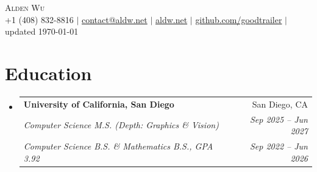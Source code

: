 \documentclass[letterpaper,11pt]{article}
\makeatletter
\newcommand{\resumeSubheadingMS}[6]{
  \vspace{-2pt}\item
    \begin{tabular*}{0.97\textwidth}[t]{l@{\extracolsep{\fill}}r}
      \textbf{#1} & #2 \\
      \textit{\small#3} & \textit{\small #4} \\
      \textit{\small#5} & \textit{\small #6} \\
    \end{tabular*}\vspace{-7pt}
}
\newcommand{\resumeSubHeadingListStart}{\begin{itemize}[leftmargin=0.15in, label={}]}
\newcommand{\resumeSubHeadingListEnd}{\end{itemize}}
\makeatother
\begin{document}

\begin{center}
    {\huge \scshape Alden Wu} \\[0.2em]
    \small
    +1 (408) 832-8816 $\mid$
    \href{mailto:contact@aldw.net}{contact@aldw.net} $\mid$
    \href{https://aldw.net/projects}{aldw.net} $\mid$
    \href{https://github.com/goodtrailer}{github.com/goodtrailer} $\mid$
    updated \today
\end{center}

\section{Education}
    \resumeSubHeadingListStart
        \resumeSubheadingMS
            {University of California, San Diego}{San Diego, CA}
            {Computer Science M.S. (Depth: Graphics \& Vision)}{Sep 2025 -- Jun 2027}
            {Computer Science B.S. \& Mathematics B.S., GPA 3.92}{Sep 2022 -- Jun 2026}
    \resumeSubHeadingListEnd

\end{document}
